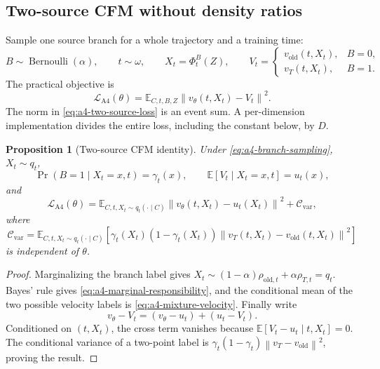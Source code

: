 \documentclass[11pt,a4paper]{article}
\newcommand{\E}{\mathbb{E}}
\newcommand{\norm}[1]{\left\lVert #1 \right\rVert}
\newcommand{\vold}{v_{\mathrm{old}}}
\newcommand{\vT}{v_T}
\newcommand{\vtheta}{v_\theta}
\theoremstyle{plain}
\newtheorem{proposition}[theorem]{Proposition}
\theoremstyle{definition}
\begin{document}
\subsection{Two-source CFM without density ratios}

Sample one source branch for a whole trajectory and a training time:
\begin{equation}
B\sim\operatorname{Bernoulli}(\alpha),
\qquad
t\sim\omega,
\qquad
X_t=\Phi_t^B(Z),
\qquad
V_t=
\begin{cases}
\vold(t,X_t), & B=0,\\
\vT(t,X_t), & B=1.
\end{cases}
\label{eq:a4-branch-sampling}
\end{equation}
The practical objective is
\begin{equation}
\mathcal L_{\mathrm{A4}}(\theta)
=
\E_{C,t,B,Z}
\norm{\vtheta(t,X_t)-V_t}^2 .
\label{eq:a4-two-source-loss}
\end{equation}
The norm in \eqref{eq:a4-two-source-loss} is an event sum.  A per-dimension implementation divides
the entire loss, including the constant below, by $D$.

\begin{proposition}[Two-source CFM identity]
\label{prop:a4-cfm}
Under \eqref{eq:a4-branch-sampling},
$X_t\sim q_t$,
\begin{equation}
\Pr(B=1\mid X_t=x,t)=\gamma_t(x),
\qquad
\E[V_t\mid X_t=x,t]=u_t(x),
\label{eq:a4-conditional-mean}
\end{equation}
and
\begin{equation}
\mathcal L_{\mathrm{A4}}(\theta)
=
\E_{C,t,X_t\sim q_t(\cdot\mid C)}
\norm{\vtheta(t,X_t)-u_t(X_t)}^2
+\mathcal C_{\mathrm{var}},
\label{eq:a4-cfm-decomposition}
\end{equation}
where
\begin{equation}
\mathcal C_{\mathrm{var}}
=
\E_{C,t,X_t\sim q_t(\cdot\mid C)}\!\left[
  \gamma_t(X_t)(1-\gamma_t(X_t))
  \norm{\vT(t,X_t)-\vold(t,X_t)}^2
\right]
\label{eq:a4-variance-constant}
\end{equation}
is independent of $\theta$.
\end{proposition}

\begin{proof}
Marginalizing the branch label gives
$X_t\sim(1-\alpha)\rho_{\mathrm{old},t}+\alpha\rho_{T,t}=q_t$.  Bayes' rule gives
\eqref{eq:a4-marginal-responsibility}, and the conditional mean of the two possible velocity
labels is \eqref{eq:a4-mixture-velocity}.  Finally write
\[
\vtheta-V_t=(\vtheta-u_t)+(u_t-V_t).
\]
Conditioned on $(t,X_t)$, the cross term vanishes because
$\E[V_t-u_t\mid t,X_t]=0$.  The conditional variance of a two-point label is
$\gamma_t(1-\gamma_t)\norm{\vT-\vold}^2$, proving the result.
\end{proof}
\end{document}
